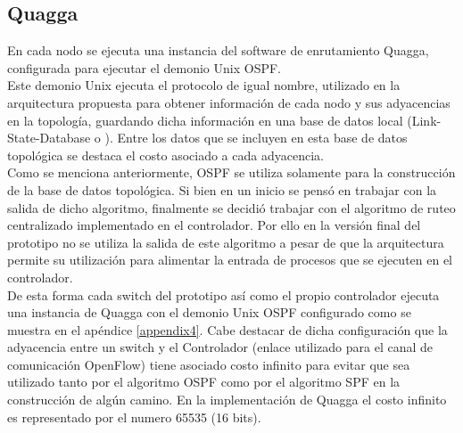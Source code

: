 
\subsection{Quagga}
En cada nodo se ejecuta una instancia del software de enrutamiento Quagga, configurada para ejecutar el demonio Unix OSPF.\\ 

Este demonio Unix ejecuta el protocolo de igual nombre, utilizado en la arquitectura propuesta para obtener información de cada nodo y sus adyacencias en la topolog\'ia, guardando dicha información en una base de datos local (Link-State-Database o ). Entre los datos que se incluyen en esta base de datos topol\'ogica se destaca el costo asociado a cada adyacencia.\\ 

Como se menciona anteriormente, OSPF se utiliza solamente para la construcci\'on de la base de datos topol\'ogica. Si bien en un inicio se pensó en trabajar con la salida de dicho algoritmo, finalmente se decidió trabajar con el algoritmo de ruteo centralizado implementado en el controlador. Por ello en la versi\'on final del prototipo no se utiliza la salida de este algoritmo a pesar de que la arquitectura permite su utilización para alimentar la entrada de procesos que se ejecuten en el controlador.\\

De esta forma cada switch del prototipo así como el propio controlador ejecuta una instancia de Quagga con el demonio Unix OSPF configurado como se muestra en el apéndice \ref{appendix4}. Cabe destacar de dicha configuración que la adyacencia entre un switch y el Controlador (enlace utilizado para el canal de comunicación OpenFlow) tiene asociado costo infinito para evitar que sea utilizado tanto por el algoritmo OSPF como por el algoritmo SPF en la construcción de algún camino. En la implementaci\'on de Quagga el costo infinito es representado por el numero 65535 (16 bits).

